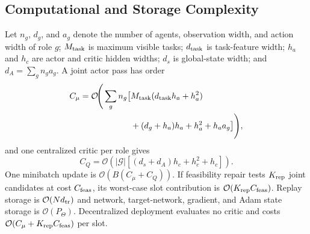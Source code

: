 \subsection{Computational and Storage Complexity}
Let $n_g$, $d_g$, and $a_g$ denote the number of agents, observation width,
and action width of role $g$; $M_{\rm task}$ is maximum visible tasks;
$d_{\rm task}$ is task-feature width; $h_a$ and $h_c$ are actor and critic
hidden widths; $d_s$ is global-state width; and
$d_A=\sum_gn_ga_g$. A joint actor pass has order
\begin{align}
C_\mu=\mathcal O\!\Bigg(\sum_gn_g\big[&
M_{\rm task}(d_{\rm task}h_a+h_a^2)\nonumber\\
&+(d_g+h_a)h_a+h_a^2+h_aa_g\big]\Bigg),
\label{eq:actor_complexity_new}
\end{align}
and one centralized critic per role gives
\begin{equation}
C_Q=\mathcal O\!\left(|\mathcal G|
\left[(d_s+d_A)h_c+h_c^2+h_c\right]\right).
\label{eq:critic_complexity_new}
\end{equation}
One minibatch update is $\mathcal O(B(C_\mu+C_Q))$. If feasibility repair
tests $K_{\rm rep}$ joint candidates at cost $C_{\rm feas}$, its worst-case
slot contribution is $\mathcal O(K_{\rm rep}C_{\rm feas})$. Replay storage is
$\mathcal O(Nd_{\rm tr})$ and network, target-network, gradient, and Adam
state storage is $\mathcal O(P_\Theta)$. Decentralized deployment evaluates no
critic and costs $\mathcal O(C_\mu+K_{\rm rep}C_{\rm feas})$ per slot.

